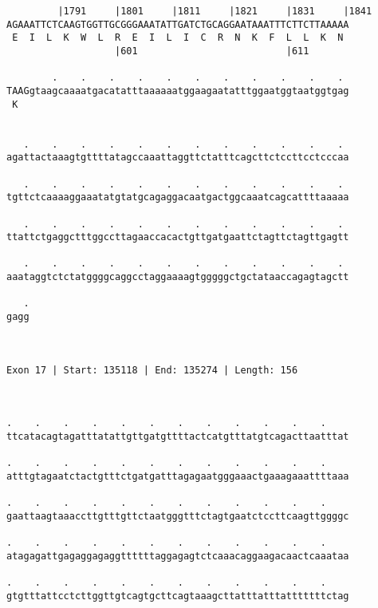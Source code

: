 \documentclass{article}
\begin{document}
\begin{Verbatim}
         |1791     |1801     |1811     |1821     |1831     |1841
AGAAATTCTCAAGTGGTTGCGGGAAATATTGATCTGCAGGAATAAATTTCTTCTTAAAAA
 E  I  L  K  W  L  R  E  I  L  I  C  R  N  K  F  L  L  K  N 
                   |601                          |611       
  
        .    .    .    .    .    .    .    .    .    .    . 
TAAGgtaagcaaaatgacatatttaaaaaatggaagaatatttggaatggtaatggtgag
 K                                                          
                                                            
  
   .    .    .    .    .    .    .    .    .    .    .    . 
agattactaaagtgttttatagccaaattaggttctatttcagcttctccttcctcccaa
                                                            
   .    .    .    .    .    .    .    .    .    .    .    . 
tgttctcaaaaggaaatatgtatgcagaggacaatgactggcaaatcagcattttaaaaa
                                                            
   .    .    .    .    .    .    .    .    .    .    .    . 
ttattctgaggctttggccttagaaccacactgttgatgaattctagttctagttgagtt
                                                            
   .    .    .    .    .    .    .    .    .    .    .    . 
aaataggtctctatggggcaggcctaggaaaagtgggggctgctataaccagagtagctt
                                                            
   .
gagg
    
    
 
Exon 17 | Start: 135118 | End: 135274 | Length: 156



.    .    .    .    .    .    .    .    .    .    .    .    
ttcatacagtagatttatattgttgatgttttactcatgtttatgtcagacttaatttat
                                                            
.    .    .    .    .    .    .    .    .    .    .    .    
atttgtagaatctactgtttctgatgatttagagaatgggaaactgaaagaaattttaaa
                                                            
.    .    .    .    .    .    .    .    .    .    .    .    
gaattaagtaaaccttgtttgttctaatgggtttctagtgaatctccttcaagttggggc
                                                            
.    .    .    .    .    .    .    .    .    .    .    .    
atagagattgagaggagaggttttttaggagagtctcaaacaggaagacaactcaaataa
                                                            
.    .    .    .    .    .    .    .    .    .    .    .    
gtgtttattcctcttggttgtcagtgcttcagtaaagcttatttatttatttttttctag
                                                            

\end{Verbatim}
\end{document}
